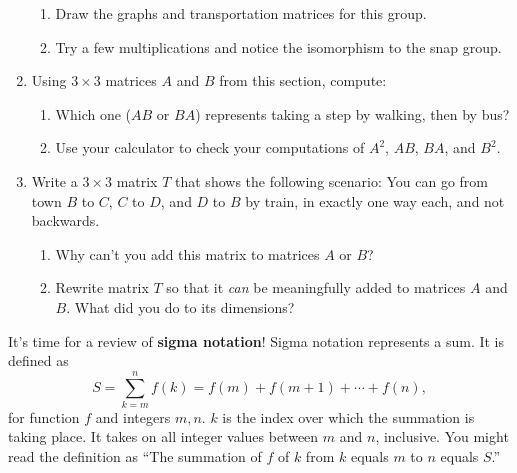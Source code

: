 \documentclass[../textbook.tex]{subfiles}
\begin{document}
\begin{enumerate}
\begin{enumerate}
\item Draw the graphs and transportation matrices for this group.
\item Try a few multiplications and notice the isomorphism to the snap group.
\end{enumerate}
\item Using $3\times 3$ matrices $A$ and $B$ from this section, compute:
\begin{enumerate}
\end{enumerate}
\begin{enumerate}
\setcounter{enumii}{\value{problem_ii}}
\item Which one ($AB$ or $BA$) represents taking a step by walking, then by bus?
\item Use your calculator to check your computations of $A^2$, $AB$, $BA$, and $B^2$.
\end{enumerate}
\item Write a $3\times 3$ matrix $T$ that shows the following scenario: You can go from town $B$ to $C$, $C$ to $D$, and $D$ to $B$ by train, in exactly one way each, and not backwards.
\begin{enumerate}
\item Why can't you add this matrix to matrices $A$ or $B$?
\item Rewrite matrix $T$ so that it \textit{can} be meaningfully added to matrices $A$ and $B$. What did you do to its dimensions?
\end{enumerate}
\setcounter{problem_i}{\value{enumi}}
\end{enumerate}

\noindent It's time for a review of \textbf{sigma notation}! Sigma notation represents a sum. It is defined as
$$S=\sum_{k=m}^{n} f(k)=f(m)+f(m+1)+\cdots + f(n),$$
for function $f$ and integers $m,n$. $k$ is the index over which the summation is taking place. It takes on all integer values between $m$ and $n$, inclusive. You might read the definition as ``The summation of $f$ of $k$ from $k$ equals $m$ to $n$ equals $S$.''
\end{document}
